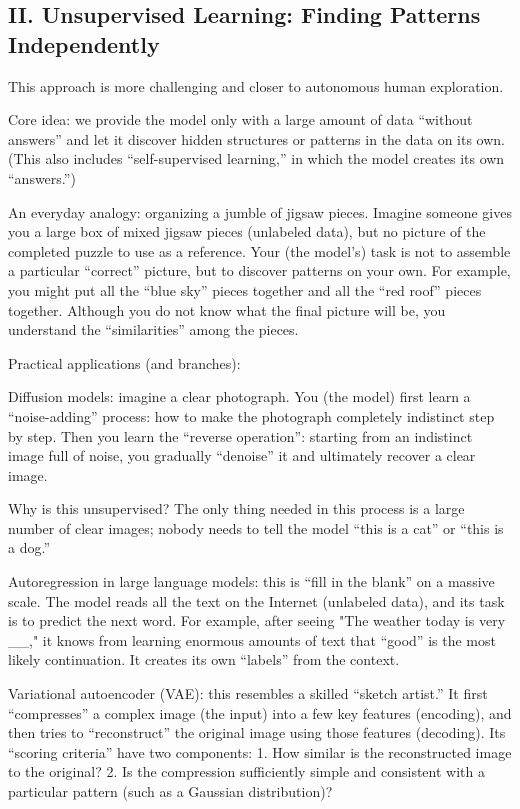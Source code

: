 \hypertarget{ii.-unsupervised-learning-finding-patterns-independently}{%
\subsection{II. Unsupervised Learning: Finding Patterns Independently}\label{ii.-unsupervised-learning-finding-patterns-independently}}

This approach is more challenging and closer to autonomous human exploration.

Core idea: we provide the model only with a large amount of data ``without answers'' and let it discover hidden structures or patterns in the data on its own. (This also includes ``self-supervised learning,'' in which the model creates its own ``answers.'')

An everyday analogy: organizing a jumble of jigsaw pieces. Imagine someone gives you a large box of mixed jigsaw pieces (unlabeled data), but no picture of the completed puzzle to use as a reference. Your (the model's) task is not to assemble a particular ``correct'' picture, but to discover patterns on your own. For example, you might put all the ``blue sky'' pieces together and all the ``red roof'' pieces together. Although you do not know what the final picture will be, you understand the ``similarities'' among the pieces.

Practical applications (and branches):

Diffusion models: imagine a clear photograph. You (the model) first learn a ``noise-adding'' process: how to make the photograph completely indistinct step by step. Then you learn the ``reverse operation'': starting from an indistinct image full of noise, you gradually ``denoise'' it and ultimately recover a clear image.

Why is this unsupervised? The only thing needed in this process is a large number of clear images; nobody needs to tell the model ``this is a cat'' or ``this is a dog.''

Autoregression in large language models: this is ``fill in the blank'' on a massive scale. The model reads all the text on the Internet (unlabeled data), and its task is to predict the next word. For example, after seeing "The weather today is very \_\_," it knows from learning enormous amounts of text that ``good'' is the most likely continuation. It creates its own ``labels'' from the context.

Variational autoencoder (VAE): this resembles a skilled ``sketch artist.'' It first ``compresses'' a complex image (the input) into a few key features (encoding), and then tries to ``reconstruct'' the original image using those features (decoding). Its ``scoring criteria'' have two components: 1. How similar is the reconstructed image to the original? 2. Is the compression sufficiently simple and consistent with a particular pattern (such as a Gaussian distribution)?

